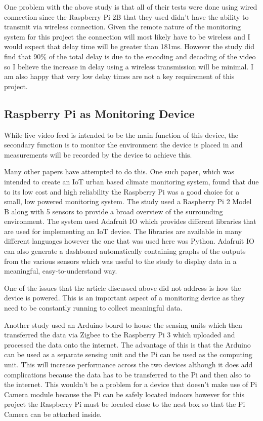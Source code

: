 \documentclass[10pt,a4paper]{article}
\begin{document}
One problem with the above study is that all of their tests were done using wired connection since the Raspberry Pi 2B that they used didn't have the ability to transmit via wireless connection. Given the remote nature of the monitoring system for this project the connection will most likely have to be wireless and I would expect that delay time will be greater than 181ms. However the study did find that 90\% of the total delay is due to the encoding and decoding of the video so I believe the increase in delay using a wireless transmission will be minimal. I am also happy that very low delay times are not a key requirement of this project.
\subsection{Raspberry Pi as Monitoring Device}
While live video feed is intended to be the main function of this device, the secondary function is to monitor the environment the device is placed in and measurements will be recorded by the device to achieve this. 

Many other papers have attempted to do this. One such paper, which was intended to create an IoT urban based climate monitoring system, found that due to its low cost and high reliability the Raspberry Pi was a good choice for a small, low powered monitoring system\cite{Shete2016}. The study used a Raspberry Pi 2 Model B along with 5 sensors to provide a broad overview of the surrounding environment. The system used Adafruit IO which provides different libraries that are used for implementing an IoT device. The libraries are available in many different languages however the one that was used here was Python. Adafruit IO can also generate a dashboard automatically containing graphs of the outputs from the various sensors which was useful to the study to display data in a meaningful, easy-to-understand way. 

One of the issues that the article discussed above did not address is how the device is powered. This is an important aspect of a monitoring device as they need to be constantly running to collect meaningful data.

Another study\cite{Sriyanka2017} used an Arduino board to house the sensing units which then transferred the data via Zigbee to the Raspberry Pi 3 which uploaded and processed the data onto the internet. The advantage of this is that the Arduino can be used as a separate sensing unit and the Pi can be used as the computing unit. This will increase performance across the two devices although it does add complications because the data has to be transferred to the Pi and then also to the internet. This wouldn't be a problem for a device that doesn't make use of Pi Camera module because the Pi can be safely located indoors however for this project the Raspberry Pi must be located close to the nest box so that the Pi Camera can be attached inside. 
\end{document}
